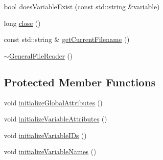 \begin{DoxyCompactItemize}
\item 
bool \hyperlink{classccmc_1_1_general_file_reader_a7752dcc4d653d0d325cbe5ce1b9a7ebe}{does\-Variable\-Exist} (const std\-::string \&variable)
\item 
long \hyperlink{classccmc_1_1_general_file_reader_a4d56da3556557ae38485abdcdeacc90e}{close} ()
\item 
const std\-::string \& \hyperlink{classccmc_1_1_general_file_reader_aa18066d5c371290ddee53de8e24e04a7}{get\-Current\-Filename} ()
\item 
\hyperlink{classccmc_1_1_general_file_reader_a7f1fe93414b533d8149b2c62d4d0b49d}{$\sim$\-General\-File\-Reader} ()
\end{DoxyCompactItemize}
\subsection*{Protected Member Functions}
\begin{DoxyCompactItemize}
\item 
void \hyperlink{classccmc_1_1_general_file_reader_a05e47e8ca0c282555e0eeb2f60f45075}{initialize\-Global\-Attributes} ()
\item 
void \hyperlink{classccmc_1_1_general_file_reader_a0d851978d821e4525d2f0c759b7a1f3b}{initialize\-Variable\-Attributes} ()
\item 
void \hyperlink{classccmc_1_1_general_file_reader_a9ed129fc4488e899b3260640d47a8d88}{initialize\-Variable\-I\-Ds} ()
\item 
void \hyperlink{classccmc_1_1_general_file_reader_a2151d69434928082138128fb3ebd3282}{initialize\-Variable\-Names} ()
\end{DoxyCompactItemize}
